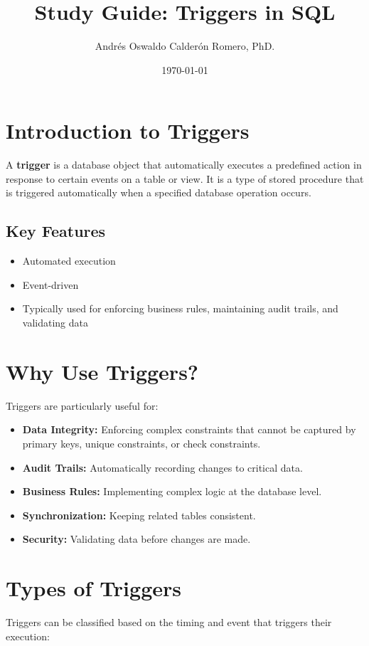 \documentclass{article}
\title{Study Guide: Triggers in SQL}
\author{Andrés Oswaldo Calderón Romero, PhD.}
\date{\today}
\begin{document}
\maketitle

\section{Introduction to Triggers}
A \textbf{trigger} is a database object that automatically executes a predefined action in response to certain events on a table or view. It is a type of stored procedure that is triggered automatically when a specified database operation occurs.

\subsection*{Key Features}
\begin{itemize}
    \item Automated execution
    \item Event-driven
    \item Typically used for enforcing business rules, maintaining audit trails, and validating data
\end{itemize}

\section{Why Use Triggers?}
Triggers are particularly useful for:
\begin{itemize}
    \item \textbf{Data Integrity:} Enforcing complex constraints that cannot be captured by primary keys, unique constraints, or check constraints.
    \item \textbf{Audit Trails:} Automatically recording changes to critical data.
    \item \textbf{Business Rules:} Implementing complex logic at the database level.
    \item \textbf{Synchronization:} Keeping related tables consistent.
    \item \textbf{Security:} Validating data before changes are made.
\end{itemize}

\section{Types of Triggers}
Triggers can be classified based on the timing and event that triggers their execution:
\end{document}
